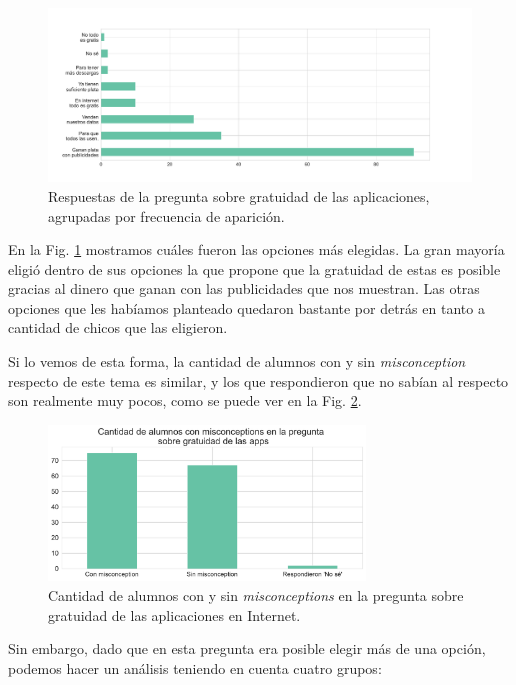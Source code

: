 \begin{figure}[h]
    \centering
    \includegraphics[width=1\textwidth]{images_analisis/22.pdf}
    \caption{Respuestas de la pregunta sobre gratuidad de las aplicaciones, agrupadas por frecuencia de aparición.}
    \label{fig:analisis22}
\end{figure}

En la Fig. \ref{fig:analisis22} mostramos cuáles fueron las opciones más elegidas. La gran mayoría eligió dentro de sus opciones la que propone que la gratuidad de estas es posible gracias al dinero que ganan con las publicidades que nos muestran. Las otras opciones que les habíamos planteado quedaron bastante por detrás en tanto a cantidad de chicos que las eligieron.

Si lo vemos de esta forma, la cantidad de alumnos con y sin \textit{misconception} respecto de este tema es similar, y los que respondieron que no sabían al respecto son realmente muy pocos, como se puede ver en la Fig. \ref{fig:analisis23}.

\begin{figure}[h]
    \centering
    \includegraphics[width=0.75\textwidth]{images_analisis/23.pdf}
    \caption{Cantidad de alumnos con y sin \textit{misconceptions} en la pregunta sobre gratuidad de las aplicaciones en Internet.}
    \label{fig:analisis23}
\end{figure}

\newpage

Sin embargo, dado que en esta pregunta era posible elegir más de una opción, podemos hacer un análisis teniendo en cuenta cuatro grupos: 

